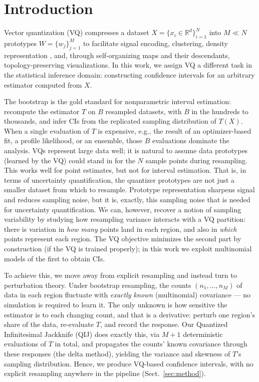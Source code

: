 \documentclass[runningheads]{llncs}
\begin{document}
\section{Introduction}\label{sec:intro}

Vector quantization (VQ) compresses a dataset $X = \{x_i \in \mathbb{R}^d\}_{i=1}^N$ into $M \ll N$ prototypes $W = \{w_j\}_{j=1}^M$ to facilitate signal encoding, clustering, density representation \cite{graf2000}, and, through self-organizing maps and their descendants, topology-preserving visualizations. In this work, we assign VQ a different task in the statistical inference domain: constructing confidence intervals for an arbitrary estimator computed from $X$.

The bootstrap \cite{efron1979} is the gold standard for nonparametric interval estimation: recompute the estimator $T$ on $B$ resampled datasets, with $B$ in the hundreds to thousands, and infer CIs from the replicated sampling distribution of $T(X)$. When a single evaluation of $T$ is expensive, e.g., the result of an optimizer-based fit, a profile likelihood, or an ensemble, those $B$ evaluations dominate the analysis. VQs represent large data well; it is natural to assume data prototypes (learned by the VQ) could stand in for the $N$ sample points during resampling. This works well for point estimates, but not for interval estimation. That is, in terms of uncertainty quantification, the quantizer prototypes are not just a smaller dataset from which to resample. Prototype representation sharpens signal and reduces sampling noise, but it is, exactly, this sampling noise that is needed for uncertainty quantification. We can, however, recover a notion of sampling variability by studying how resampling variance interacts with a VQ partition: there is variation in \emph{how many} points land in each region, and also in \emph{which} points represent each region. The VQ objective minimizes the second part by construction (if the VQ is trained properly); in this work we exploit multinomial models of the first to obtain CIs.

To achieve this, we move away from explicit resampling and instead turn to perturbation theory. Under bootstrap resampling, the counts $(n_1,\dots,n_M)$ of data in each region fluctuate with \emph{exactly known} (multinomial) covariance --- no simulation is required to learn it. The only unknown is how sensitive the estimator is to each changing count, and that is a derivative: perturb one region's share of the data, re-evaluate $T$, and record the response. Our Quantized Infinitesimal Jackknife (QIJ) does exactly this, via $M{+}1$ deterministic evaluations of $T$ in total, and propagates the counts' known covariance through these responses (the delta method), yielding the variance and skewness of $T$'s sampling distribution. Hence, we produce VQ-based confidence intervals, with no explicit resampling anywhere in the pipeline (Sect.~\ref{sec:method}).
\end{document}
